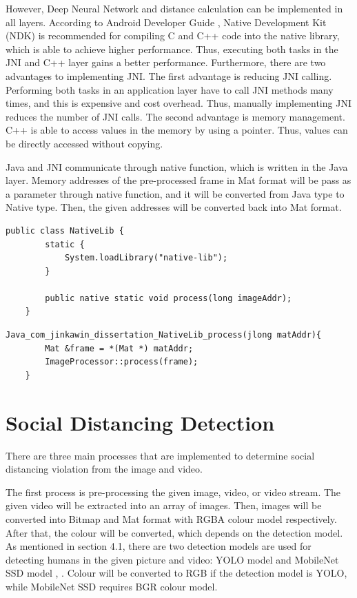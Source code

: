         However, Deep Neural Network and distance calculation can be implemented in all layers.
        According to Android Developer Guide \cite{ANDROID-01},
        Native Development Kit (NDK) is recommended for compiling C and C++ code into the native library,
        which is able to achieve higher performance.
        Thus, executing both tasks in the JNI and C++ layer gains a better performance.
        Furthermore, there are two advantages to implementing JNI.
            The first advantage is reducing JNI calling. Performing both tasks in an application layer have to call JNI methods many times,
                and this is expensive and cost overhead.
                Thus, manually implementing JNI reduces the number of JNI calls.
            The second advantage is memory management. C++ is able to access values in the memory by using a pointer.
                Thus, values can be directly accessed without copying.

        Java and JNI communicate through native function, which is written in the Java layer.
        Memory addresses of the pre-processed frame in Mat format will be pass as a parameter through native function,
        and it will be converted from Java type to Native type.
        Then, the given addresses will be converted back into Mat format.

\begin{lstlisting}[caption={Java Native Function},captionpos=b]
    public class NativeLib {
        static {
            System.loadLibrary("native-lib");
        }

        public native static void process(long imageAddr);
    }
\end{lstlisting}

\begin{lstlisting}[caption={C++ JNI Method},captionpos=b]
    Java_com_jinkawin_dissertation_NativeLib_process(jlong matAddr){
        Mat &frame = *(Mat *) matAddr;
        ImageProcessor::process(frame);
    }
\end{lstlisting}

    \section{Social Distancing Detection}
        There are three main processes that are implemented to determine social distancing violation from the image and video.

        The first process is pre-processing the given image, video, or video stream.
        The given video will be extracted into an array of images.
        Then, images will be converted into Bitmap and Mat format with RGBA colour model respectively.
        After that, the colour will be converted, which depends on the detection model.
        As mentioned in section 4.1, there are two detection models are used for detecting humans in the given picture and video: YOLO model and MobileNet SSD model \cite{tensorflow2015-whitepaper}, \cite{YOLO-v3}.
        Colour will be converted to RGB if the detection model is YOLO,
        while MobileNet SSD requires BGR colour model.


